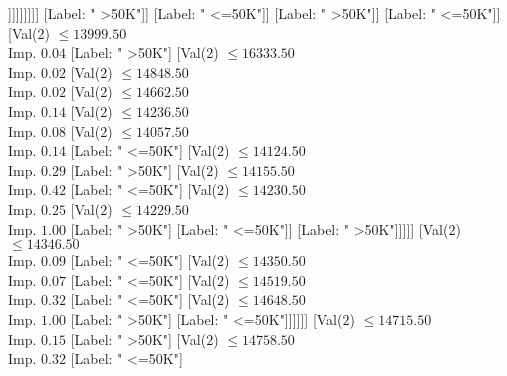 \documentclass[margin=10pt]{standalone}
\begin{document}
\begin{forest}
																											[Label: " <=50K"]
																											[Val($2$) $ \leq 13344.50$ \\ Imp. $1.00$
																												[Label: " >50K"]
																												[Label: " <=50K"]]]]]]]]]
																				[Label: " >50K"]]
																			[Label: " <=50K"]]
																		[Label: " >50K"]]
																	[Label: " <=50K"]]
																[Val($2$) $ \leq 13999.50$ \\ Imp. $0.04$
																	[Label: " >50K"]
																	[Val($2$) $ \leq 16333.50$ \\ Imp. $0.02$
																		[Val($2$) $ \leq 14848.50$ \\ Imp. $0.02$
																			[Val($2$) $ \leq 14662.50$ \\ Imp. $0.14$
																				[Val($2$) $ \leq 14236.50$ \\ Imp. $0.08$
																					[Val($2$) $ \leq 14057.50$ \\ Imp. $0.14$
																						[Label: " <=50K"]
																						[Val($2$) $ \leq 14124.50$ \\ Imp. $0.29$
																							[Label: " >50K"]
																							[Val($2$) $ \leq 14155.50$ \\ Imp. $0.42$
																								[Label: " <=50K"]
																								[Val($2$) $ \leq 14230.50$ \\ Imp. $0.25$
																									[Val($2$) $ \leq 14229.50$ \\ Imp. $1.00$
																										[Label: " >50K"]
																										[Label: " <=50K"]]
																									[Label: " >50K"]]]]]
																					[Val($2$) $ \leq 14346.50$ \\ Imp. $0.09$
																						[Label: " <=50K"]
																						[Val($2$) $ \leq 14350.50$ \\ Imp. $0.07$
																							[Label: " <=50K"]
																							[Val($2$) $ \leq 14519.50$ \\ Imp. $0.32$
																								[Label: " <=50K"]
																								[Val($2$) $ \leq 14648.50$ \\ Imp. $1.00$
																									[Label: " >50K"]
																									[Label: " <=50K"]]]]]]
																				[Val($2$) $ \leq 14715.50$ \\ Imp. $0.15$
																					[Label: " >50K"]
																					[Val($2$) $ \leq 14758.50$ \\ Imp. $0.32$
																						[Label: " <=50K"]

\end{forest}
\end{document}

